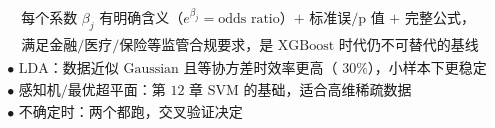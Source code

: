 \begin{center}
{\begin{minipage}{0.92\textwidth}
\[{\begin{array}{l}
\quad\text{每个系数 }\beta_j\text{ 有明确含义（}e^{\beta_j}=\text{odds ratio）+ 标准误/p 值 + 完整公式，} \\
\quad\text{满足金融/医疗/保险等监管合规要求，是 XGBoost 时代仍不可替代的基线} \\
\text{• LDA：数据近似 Gaussian 且等协方差时效率更高（~30\%），小样本下更稳定} \\
\text{• 感知机/最优超平面：第 12 章 SVM 的基础，适合高维稀疏数据} \\
\text{• 不确定时：两个都跑，交叉验证决定}
\end{array}}
\]
\end{minipage}}
\end{center}
